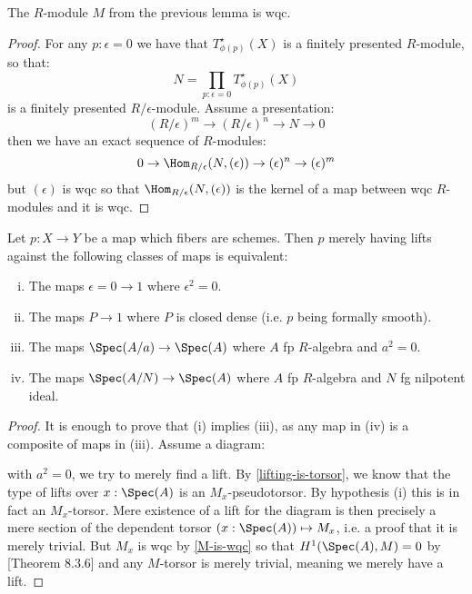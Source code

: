 \begin{lemma}\label{M-is-wqc}
The $R$-module $M$ from the previous lemma is wqc.
\end{lemma}

\begin{proof}
For any $p:\epsilon=0$ we have that $T^\star_{\phi(p)}(X)$ is a finitely presented $R$-module, so that:
\[N = \prod_{p:\epsilon=0}T^\star_{\phi(p)}(X)\]
is a finitely presented $R/\epsilon$-module. Assume a presentation:
\[
(R/\epsilon)^m \to (R/\epsilon)^n\to N\to 0
\]
then we have an exact sequence of $R$-modules:
\[
0\to \Hom_{R/\epsilon}(N,(\epsilon)) \to (\epsilon)^n\to (\epsilon)^m
\]
but $(\epsilon)$ is wqc so that $\Hom_{R/\epsilon}(N,(\epsilon))$ is the kernel of a map between wqc $R$-modules and it is wqc.
\end{proof}

\begin{proposition}
Let $p:X\to Y$ be a map which fibers are schemes. Then $p$ merely having lifts against the following classes of maps is equivalent:
\begin{enumerate}[(i)]
\item The maps $\epsilon=0\to 1$ where $\epsilon^2=0$.
\item The maps $P\to 1$ where $P$ is closed dense (i.e. $p$ being formally smooth).
\item The maps $\Spec(A/a)\to \Spec(A)$ where $A$ fp $R$-algebra and $a^2=0$.
\item The maps $\Spec(A/N)\to \Spec(A)$ where $A$ fp $R$-algebra and $N$ fg nilpotent ideal.
\end{enumerate}
\end{proposition}

\begin{proof}
It is enough to prove that (i) implies (iii), as any map in (iv) is a composite of maps in (iii). Assume a diagram:
 \begin{center}
    \end{center} 
    with $a^2=0$, we try to merely find a lift. By \cref{lifting-is-torsor}, we know that the type of lifts over $x:\Spec(A)$ is an $M_x$-pseudotorsor. By hypothesis (i) this is in fact an $M_x$-torsor. Mere existence of a lift for the diagram is then precisely a mere section of the dependent torsor $(x:\Spec(A))\mapsto M_x$, i.e. a proof that it is merely trivial. But $M_x$ is wqc by \cref{M-is-wqc} so that $H^1(\Spec(A),M)=0$ by \cite{draft}[Theorem 8.3.6] and any $M$-torsor is merely trivial, meaning we merely have a lift.
\end{proof}

